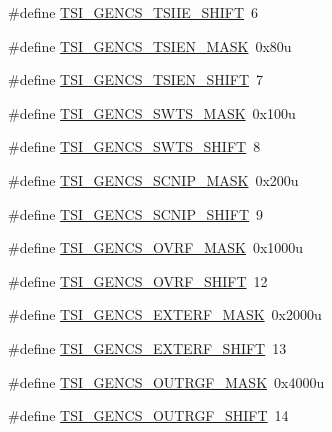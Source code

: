 \begin{DoxyCompactItemize}
\#define \hyperlink{group___t_s_i___register___masks_ga1ce2a7ae1f44df3b88d3028b2453f9c0}{T\+S\+I\+\_\+\+G\+E\+N\+C\+S\+\_\+\+T\+S\+I\+I\+E\+\_\+\+S\+H\+I\+FT}~6
\item 
\#define \hyperlink{group___t_s_i___register___masks_gafa7ce02781bc0e3d369d9a00a77b480f}{T\+S\+I\+\_\+\+G\+E\+N\+C\+S\+\_\+\+T\+S\+I\+E\+N\+\_\+\+M\+A\+SK}~0x80u
\item 
\#define \hyperlink{group___t_s_i___register___masks_ga503402dbca8eec965cad561df32e7cf5}{T\+S\+I\+\_\+\+G\+E\+N\+C\+S\+\_\+\+T\+S\+I\+E\+N\+\_\+\+S\+H\+I\+FT}~7
\item 
\#define \hyperlink{group___t_s_i___register___masks_ga3e70511a926ede552203b0d191591554}{T\+S\+I\+\_\+\+G\+E\+N\+C\+S\+\_\+\+S\+W\+T\+S\+\_\+\+M\+A\+SK}~0x100u
\item 
\#define \hyperlink{group___t_s_i___register___masks_gaf0cc5b9ce61c09cd8f5b64f85b3c11aa}{T\+S\+I\+\_\+\+G\+E\+N\+C\+S\+\_\+\+S\+W\+T\+S\+\_\+\+S\+H\+I\+FT}~8
\item 
\#define \hyperlink{group___t_s_i___register___masks_gaf7212a89bc45902f2ed4cee12a1ceb92}{T\+S\+I\+\_\+\+G\+E\+N\+C\+S\+\_\+\+S\+C\+N\+I\+P\+\_\+\+M\+A\+SK}~0x200u
\item 
\#define \hyperlink{group___t_s_i___register___masks_ga372b92d46c9f071d4fdee3edcc0d5219}{T\+S\+I\+\_\+\+G\+E\+N\+C\+S\+\_\+\+S\+C\+N\+I\+P\+\_\+\+S\+H\+I\+FT}~9
\item 
\#define \hyperlink{group___t_s_i___register___masks_ga9d9ee2965d913e5b2eb7a9a71a5c26e8}{T\+S\+I\+\_\+\+G\+E\+N\+C\+S\+\_\+\+O\+V\+R\+F\+\_\+\+M\+A\+SK}~0x1000u
\item 
\#define \hyperlink{group___t_s_i___register___masks_ga36164d96be108b8f9e9c9ba32db4363c}{T\+S\+I\+\_\+\+G\+E\+N\+C\+S\+\_\+\+O\+V\+R\+F\+\_\+\+S\+H\+I\+FT}~12
\item 
\#define \hyperlink{group___t_s_i___register___masks_ga33e3d274099483b6ebf7897b7d72b866}{T\+S\+I\+\_\+\+G\+E\+N\+C\+S\+\_\+\+E\+X\+T\+E\+R\+F\+\_\+\+M\+A\+SK}~0x2000u
\item 
\#define \hyperlink{group___t_s_i___register___masks_ga90ccee35b83ef31a092ad15e533e6396}{T\+S\+I\+\_\+\+G\+E\+N\+C\+S\+\_\+\+E\+X\+T\+E\+R\+F\+\_\+\+S\+H\+I\+FT}~13
\item 
\#define \hyperlink{group___t_s_i___register___masks_gae0670e2e8c0eb55717171acb5a2bebfe}{T\+S\+I\+\_\+\+G\+E\+N\+C\+S\+\_\+\+O\+U\+T\+R\+G\+F\+\_\+\+M\+A\+SK}~0x4000u
\item 
\#define \hyperlink{group___t_s_i___register___masks_gaa269027bdefea51eddd47bfc47140224}{T\+S\+I\+\_\+\+G\+E\+N\+C\+S\+\_\+\+O\+U\+T\+R\+G\+F\+\_\+\+S\+H\+I\+FT}~14

\end{DoxyCompactItemize}
